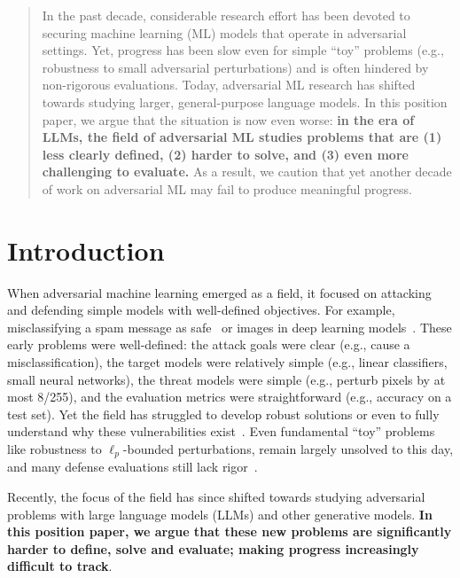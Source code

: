 
\begin{abstract}
In the past decade, considerable research effort has been devoted to securing machine learning (ML) models that operate in adversarial settings. Yet, progress has been slow even for simple ``toy'' problems (e.g., robustness to small adversarial perturbations) and is often hindered by non-rigorous evaluations.
Today, adversarial ML research has shifted towards studying larger, general-purpose language models.
In this position paper, we argue that the situation is now even worse: \textbf{in the era of LLMs, the field of adversarial ML studies problems that are (1) less clearly defined, (2) harder to solve, and (3) even more challenging to evaluate.}
As a result, we caution that yet another decade of work on adversarial ML may fail to produce meaningful progress.
\end{abstract}


\section{Introduction}





When adversarial machine learning emerged as a field, it focused on attacking and defending simple models with well-defined objectives. For example, 
misclassifying a spam message as safe~\citep{graham2004beat} or images in deep learning models~\citep{biggio2013evasion,szegedy2013intriguing,goodfellow2014explaining}. These early problems were well-defined: the attack goals were clear (e.g., cause a misclassification), the target models were relatively simple (e.g., linear classifiers, small neural networks), the threat models were simple (e.g., perturb pixels by at most 8/255), and the evaluation metrics were straightforward (e.g., accuracy on a test set). 
Yet the field has struggled to develop robust solutions or even to fully understand why these vulnerabilities exist~\citep{barreno2006can,shafahi2018are}. Even fundamental ``toy'' problems like robustness to $\ell_p$-bounded perturbations,  remain largely unsolved to this day, and many defense evaluations still lack rigor~\citep{carlini2017towards,carlini2019evaluating,tramer2020adaptive}.

Recently, the focus of the field has since shifted towards studying adversarial problems with large language models (LLMs) and other generative models. \textbf{In this position paper, we argue that these new problems are significantly harder to define, solve and evaluate; making progress increasingly difficult to track}.


